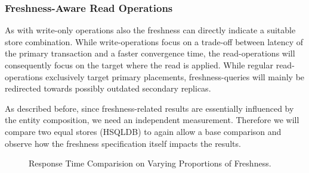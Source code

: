
\subsubsection{Freshness-Aware Read Operations}

As with write-only operations also the freshness can directly indicate a suitable store combination.
While write-operations focus on a trade-off between latency of the primary transaction and a faster convergence time,
the read-operations will consequently focus on the target where the read is applied. While regular read-operations exclusively target
primary placements, freshness-queries will mainly be redirected towards possibly outdated secondary replicas.


As described before, since freshness-related results are essentially influenced by the entity composition, we need an independent measurement.
Therefore we will compare two equal stores (HSQLDB) to again allow a base comparison and observe how the freshness specification itself impacts the results.


\begin{figure}[t] 
    \centering 
    \caption{Response Time Comparision on Varying Proportions of Freshness.}
    \label{fig:fresh0}
\end{figure}



